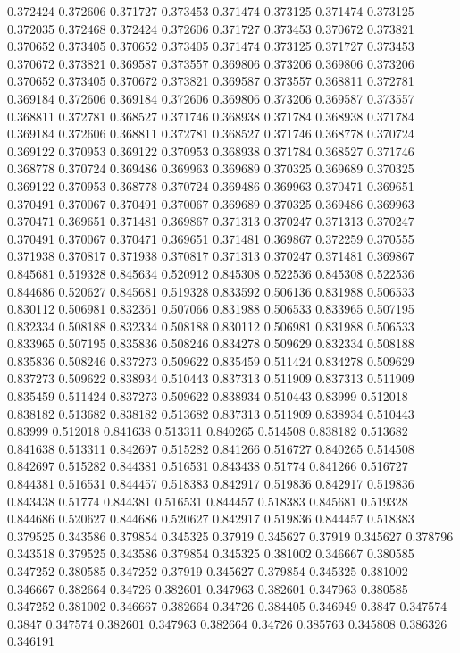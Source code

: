 0.372424 0.372606
0.371727 0.373453
0.371474 0.373125
0.371474 0.373125
0.372035 0.372468
0.372424 0.372606
0.371727 0.373453
0.370672 0.373821
0.370652 0.373405
0.370652 0.373405
0.371474 0.373125
0.371727 0.373453
0.370672 0.373821
0.369587 0.373557
0.369806 0.373206
0.369806 0.373206
0.370652 0.373405
0.370672 0.373821
0.369587 0.373557
0.368811 0.372781
0.369184 0.372606
0.369184 0.372606
0.369806 0.373206
0.369587 0.373557
0.368811 0.372781
0.368527 0.371746
0.368938 0.371784
0.368938 0.371784
0.369184 0.372606
0.368811 0.372781
0.368527 0.371746
0.368778 0.370724
0.369122 0.370953
0.369122 0.370953
0.368938 0.371784
0.368527 0.371746
0.368778 0.370724
0.369486 0.369963
0.369689 0.370325
0.369689 0.370325
0.369122 0.370953
0.368778 0.370724
0.369486 0.369963
0.370471 0.369651
0.370491 0.370067
0.370491 0.370067
0.369689 0.370325
0.369486 0.369963
0.370471 0.369651
0.371481 0.369867
0.371313 0.370247
0.371313 0.370247
0.370491 0.370067
0.370471 0.369651
0.371481 0.369867
0.372259 0.370555
0.371938 0.370817
0.371938 0.370817
0.371313 0.370247
0.371481 0.369867
0.845681 0.519328
0.845634 0.520912
0.845308 0.522536
0.845308 0.522536
0.844686 0.520627
0.845681 0.519328
0.833592 0.506136
0.831988 0.506533
0.830112 0.506981
0.832361 0.507066
0.831988 0.506533
0.833965 0.507195
0.832334 0.508188
0.832334 0.508188
0.830112 0.506981
0.831988 0.506533
0.833965 0.507195
0.835836 0.508246
0.834278 0.509629
0.832334 0.508188
0.835836 0.508246
0.837273 0.509622
0.835459 0.511424
0.834278 0.509629
0.837273 0.509622
0.838934 0.510443
0.837313 0.511909
0.837313 0.511909
0.835459 0.511424
0.837273 0.509622
0.838934 0.510443
0.83999 0.512018
0.838182 0.513682
0.838182 0.513682
0.837313 0.511909
0.838934 0.510443
0.83999 0.512018
0.841638 0.513311
0.840265 0.514508
0.838182 0.513682
0.841638 0.513311
0.842697 0.515282
0.841266 0.516727
0.840265 0.514508
0.842697 0.515282
0.844381 0.516531
0.843438 0.51774
0.841266 0.516727
0.844381 0.516531
0.844457 0.518383
0.842917 0.519836
0.842917 0.519836
0.843438 0.51774
0.844381 0.516531
0.844457 0.518383
0.845681 0.519328
0.844686 0.520627
0.844686 0.520627
0.842917 0.519836
0.844457 0.518383
0.379525 0.343586
0.379854 0.345325
0.37919 0.345627
0.37919 0.345627
0.378796 0.343518
0.379525 0.343586
0.379854 0.345325
0.381002 0.346667
0.380585 0.347252
0.380585 0.347252
0.37919 0.345627
0.379854 0.345325
0.381002 0.346667
0.382664 0.34726
0.382601 0.347963
0.382601 0.347963
0.380585 0.347252
0.381002 0.346667
0.382664 0.34726
0.384405 0.346949
0.3847 0.347574
0.3847 0.347574
0.382601 0.347963
0.382664 0.34726
0.385763 0.345808
0.386326 0.346191
